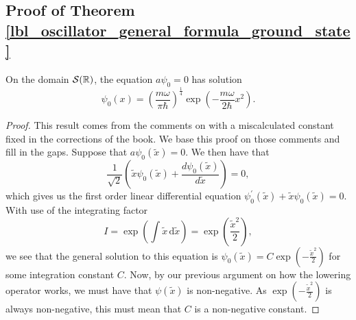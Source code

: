 \subsection{Proof of Theorem \eqref{lbl_oscillator_general_formula_ground_state}}\label{proof_lbl_oscillator_general_formula_ground_state}

\begin{theorem}
  On the domain $\mathcal{S}(\mathbb{R})$, the equation $a \psi_0 = 0$ has solution
  \begin{equation*}
    \psi_0 (x) = \left(\frac{m \omega}{\pi \hbar}\right)^{\frac{1}{4}} \exp\left( -\frac{m \omega}{2 \hbar}x^2 \right).
  \end{equation*}
\end{theorem}
\begin{proof}
  This result comes from the comments on {\cite[p.232]{Hall2013}} with a miscalculated constant fixed in the corrections of the book. We base this proof on those comments and fill in the gaps. Suppose that $a\psi_0(\tilde{x}) = 0$. We then have that
  \begin{equation*}
    \frac{1}{\sqrt{2}} \left( \tilde{x}\psi_0 (\tilde{x}) + \frac{d\psi_0(\tilde{x})}{d\tilde{x}} \right) = 0,
  \end{equation*}
  which gives us the first order linear differential equation $\psi_0^{\prime}(\tilde{x}) + \tilde{x}\psi_0(\tilde{x}) = 0$. With use of the integrating factor
  \begin{equation*}
    I = \exp\left(\int \tilde{x} \,\mathrm{d}\tilde{x}\right) = \exp\left(\frac{\tilde{x}^2}{2}\right),
  \end{equation*}
  we see that the general solution to this equation is \(\psi_0(\tilde{x}) = C \exp\left(-\frac{\tilde{x}^2}{2}\right)\) for some integration constant $C$. Now, by our previous argument on how the lowering operator works, we must have that $\psi(\tilde{x})$ is non-negative. As $\exp\left(-\frac{\tilde{x}^2}{2}\right)$ is always non-negative, this must mean that $C$ is a non-negative constant.

  \medskip


\end{proof}
